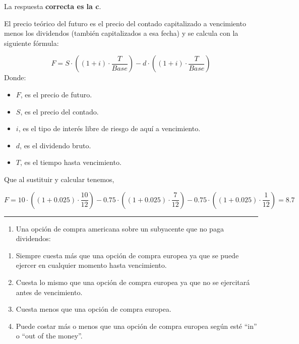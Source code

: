 \documentclass[
  letterpaper,
  DIV=11,
  numbers=noendperiod]{scrreprt}
\providecommand{\tightlist}{%
  \setlength{\itemsep}{0pt}\setlength{\parskip}{0pt}}\usepackage{longtable,booktabs,array}
\begin{document}
\begin{tcolorbox}[enhanced jigsaw, left=2mm, opacityback=0, colback=white, breakable, arc=.35mm, bottomrule=.15mm, rightrule=.15mm, toprule=.15mm, leftrule=.75mm, colframe=quarto-callout-tip-color-frame]
\begin{minipage}[t]{5.5mm}
\textcolor{quarto-callout-tip-color}{\faLightbulb}
\end{minipage}%
\begin{minipage}[t]{\textwidth - 5.5mm}

La respuesta \textbf{correcta es la c}.

El precio teórico del futuro es el precio del contado capitalizado a
vencimiento menos los dividendos (también capitalizados a esa fecha) y
se calcula con la siguiente fórmula:

\[F=S\cdot\left((1+i)\cdot\frac{T}{Base}\right)-d\cdot\left((1+i)\cdot\frac{T}{Base}\right)\]
Donde:

\begin{itemize}
\item
  \(F\), es el precio de futuro.
\item
  \(S\), es el precio del contado.
\item
  \(i\), es el tipo de interés libre de riesgo de aquí a vencimiento.
\item
  \(d\), es el dividendo bruto.
\item
  \(T\), es el tiempo hasta vencimiento.
\end{itemize}

Que al sustituir y calcular tenemos,

\[F=10\cdot\left((1+0.025)\cdot\frac{10}{12}\right)-0.75\cdot\left((1+0.025)\cdot\frac{7}{12}\right)-0.75\cdot\left((1+0.025)\cdot\frac{1}{12}\right)=8.7\]

\end{minipage}%
\end{tcolorbox}

\begin{center}\rule{0.5\linewidth}{0.5pt}\end{center}

\begin{enumerate}
\def\labelenumi{\arabic{enumi}.}
\setcounter{enumi}{58}
\tightlist
\item
  Una opción de compra americana sobre un subyacente que no paga
  dividendos:
\end{enumerate}

\begin{enumerate}
\def\labelenumi{\alph{enumi})}
\item
  Siempre cuesta más que una opción de compra europea ya que se puede
  ejercer en cualquier momento hasta vencimiento.
\item
  Cuesta lo mismo que una opción de compra europea ya que no se
  ejercitará antes de vencimiento.
\item
  Cuesta menos que una opción de compra europea.
\item
  Puede costar más o menos que una opción de compra europea según esté
  ``in'' o ``out of the money''.
\end{enumerate}
\end{document}
